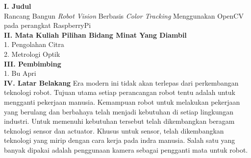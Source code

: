 \documentclass[a4paper,12pt]{article}
\begin{document}
\begin{flushleft}
  \noindent \textbf{I. \hspace{10pt} Judul}\\
  Rancang Bangun \textit{Robot Vision} Berbasis \textit{Color Tracking} Menggunakan OpenCV pada perangkat RaspberryPi
  \\[10pt]
  \noindent \textbf{II. \hspace{9pt} Mata Kuliah Pilihan Bidang Minat Yang Diambil}\\
  1. Pengolahan Citra\\
  2. Metrologi Optik
  \\[10pt]
  \noindent \textbf{III. \hspace{8pt} Pembimbing}\\
  1. Bu Apri
  \\[10pt]
  \noindent \textbf{IV. \hspace{9pt} Latar Belakang}
  \justify \hspace{20pt} Era modern ini tidak akan terlepas dari perkembangan teknologi robot.
  Tujuan utama setiap perancangan robot tentu adalah untuk mengganti pekerjaan manusia.
  Kemampuan robot untuk melakukan pekerjaan yang berulang dan berbahaya telah menjadi
  kebutuhan di setiap lingkungan industri. Untuk memenuhi kebutuhan tersebut telah
  dikembangkan beragam teknologi sensor dan actuator. Khusus untuk sensor, telah
  dikembangkan teknologi yang mirip dengan cara kerja pada indra manusia. Salah satu yang
  banyak dipakai adalah penggunaan kamera sebagai pengganti mata untuk robot.
\end{flushleft}
\end{document}
